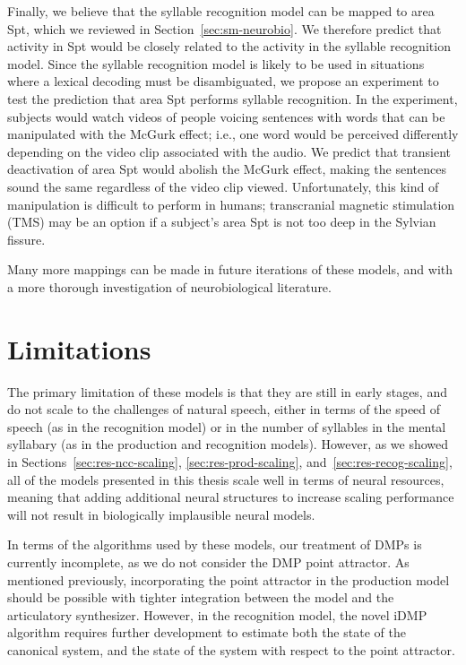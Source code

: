 Finally, we believe that
the syllable recognition model
can be mapped to area Spt,
which we reviewed
in Section~\ref{sec:sm-neurobio}.
We therefore predict that
activity in Spt would
be closely related to the activity
in the syllable recognition model.
Since the syllable recognition model
is likely to be used in situations
where a lexical decoding must be
disambiguated,
we propose an experiment to test
the prediction that area Spt
performs syllable recognition.
In the experiment,
subjects would watch videos
of people voicing sentences
with words that can be manipulated
with the McGurk effect;
i.e., one word would be perceived
differently depending on the
video clip associated with the audio.
We predict that transient
deactivation of area Spt would
abolish the McGurk effect,
making the sentences sound the same
regardless of the video clip viewed.
Unfortunately, this kind of manipulation
is difficult to perform in humans;
transcranial magnetic stimulation (TMS)
may be an option if a subject's
area Spt is not too deep in the
Sylvian fissure.

Many more mappings can be made
in future iterations of these models,
and with a more thorough investigation
of neurobiological literature.

\section{Limitations}

The primary limitation of these models
is that they are still in early stages,
and do not scale to the challenges
of natural speech,
either in terms of the speed
of speech (as in the recognition model)
or in the number of syllables
in the mental syllabary
(as in the production and recognition models).
However, as we showed in
Sections~\ref{sec:res-ncc-scaling},
\ref{sec:res-prod-scaling},
and~\ref{sec:res-recog-scaling},
all of the models presented in this thesis
scale well in terms of neural resources,
meaning that adding additional neural structures
to increase scaling performance
will not result in biologically implausible
neural models.

In terms of the algorithms used
by these models,
our treatment of DMPs is currently incomplete,
as we do not consider
the DMP point attractor.
As mentioned previously,
incorporating the point attractor
in the production model
should be possible with tighter integration
between the model
and the articulatory synthesizer.
However, in the recognition model,
the novel iDMP algorithm
requires further development
to estimate both the state of the
canonical system,
and the state of the system
with respect to the point attractor.

